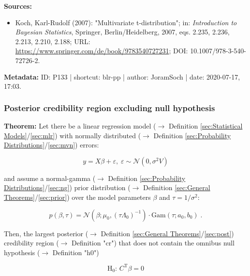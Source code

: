 \documentclass[a4paper,12pt,twoside]{book}
\begin{document}
\vspace{1em}
\textbf{Sources:}
\begin{itemize}
\item Koch, Karl-Rudolf (2007): "Multivariate t-distribution"; in: \textit{Introduction to Bayesian Statistics}, Springer, Berlin/Heidelberg, 2007, eqs. 2.235, 2.236, 2.213, 2.210, 2.188; URL: \url{https://www.springer.com/de/book/9783540727231}; DOI: 10.1007/978-3-540-72726-2.
\end{itemize}


\vspace{1em}
\textbf{Metadata:} ID: P133 | shortcut: blr-pp | author: JoramSoch | date: 2020-07-17, 17:03.
\vspace{1em}



\subsubsection[\textbf{Posterior credibility region excluding null hypothesis}]{Posterior credibility region excluding null hypothesis} \label{sec:blr-pcr}
\setcounter{equation}{0}

\textbf{Theorem:} Let there be a linear regression model ($\rightarrow$ Definition \ref{sec:Statistical Models}/\ref{sec:mlr}) with normally distributed ($\rightarrow$ Definition \ref{sec:Probability Distributions}/\ref{sec:mvn}) errors:

\begin{equation} \label{eq:blr-pcr-GLM}
y = X \beta + \varepsilon, \; \varepsilon \sim \mathcal{N}(0, \sigma^2 V)
\end{equation}

and assume a normal-gamma ($\rightarrow$ Definition \ref{sec:Probability Distributions}/\ref{sec:ng}) prior distribution ($\rightarrow$ Definition \ref{sec:General Theorems}/\ref{sec:prior}) over the model parameters $\beta$ and $\tau = 1/\sigma^2$:

\begin{equation} \label{eq:blr-pcr-GLM-NG-prior}
p(\beta,\tau) = \mathcal{N}(\beta; \mu_0, (\tau \Lambda_0)^{-1}) \cdot \mathrm{Gam}(\tau; a_0, b_0) \; .
\end{equation}

Then, the largest posterior ($\rightarrow$ Definition \ref{sec:General Theorems}/\ref{sec:post}) credibility region ($\rightarrow$ Definition "cr") that does not contain the omnibus null hypothesis ($\rightarrow$ Definition "h0")

\begin{equation} \label{eq:blr-pcr-GLM-H0}
\mathrm{H}_0: \, C^\mathrm{T} \beta = 0
\end{equation}
\end{document}
